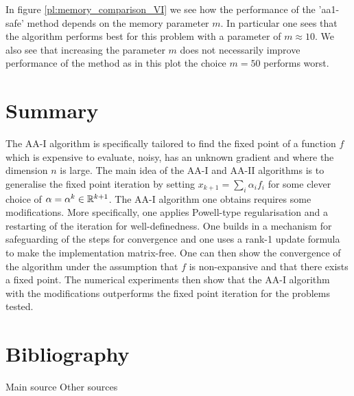 In figure \ref{pl:memory_comparison_VI}  we see how the performance of the 'aa1-safe' method depends on the memory parameter $m$. In particular one sees that the algorithm performs best for this problem with a parameter of $m\approx10$. We also see that increasing the parameter $m$ does not necessarily improve performance of the method as in this plot the choice $m=50$ performs worst.

\newpage

\section{Summary}

The AA-I algorithm is specifically tailored to find the fixed point of a function $f$ which is expensive to evaluate, noisy, has an unknown gradient and where the dimension $n$ is large. The main idea of the AA-I and AA-II algorithms is to generalise the fixed point iteration by setting $x_{k+1}=\sum_i\alpha_if_i$ for some clever choice of $\alpha=\alpha^k\in\mathbb{R}^{k+1}$. The AA-I algorithm one obtains requires some modifications. More specifically, one applies Powell-type regularisation and a restarting of the iteration for well-definedness. One builds in a mechanism for safeguarding of the steps for convergence and one uses a rank-1 update formula to make the implementation matrix-free. One can then show the convergence of the algorithm under the assumption that $f$ is non-expansive and that there exists a fixed point. The numerical experiments then show that the AA-I algorithm with the modifications outperforms the fixed point iteration for the problems tested.



\section*{Bibliography}
\nocite{*}
Main source
\printbibliography[heading=none, keyword={main}]
\noindent Other sources
\printbibliography[heading=none, keyword={secondary}]


